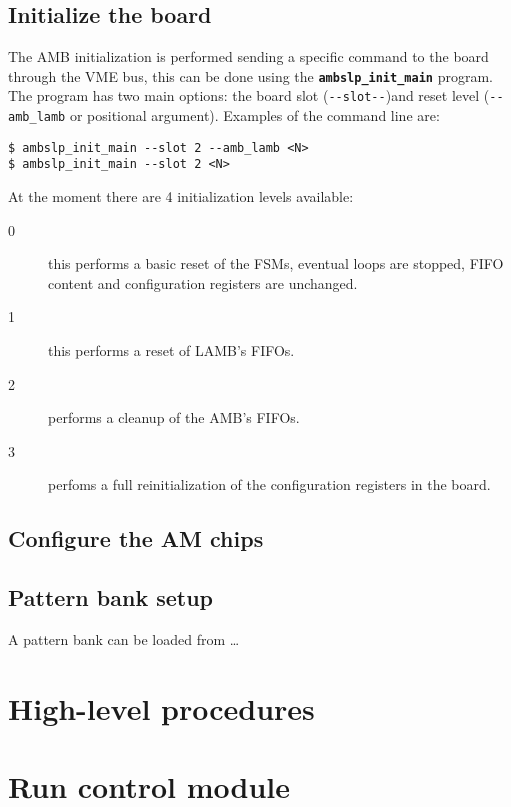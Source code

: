 \documentclass[UKenglish]{latex/atlasdoc}
\begin{document}
\subsection{Initialize the board}
\label{sec:ambslpinit}

The AMB initialization is performed sending a specific command
to the board through the VME bus, this can be done using the 
\textbf{\texttt{ambslp\_init\_main}} program. The program has two
main options: the board slot (\verb|--slot--|)and reset level (\verb|--amb_lamb| 
or positional argument).
Examples of the command line are:
\begin{verbatim}
$ ambslp_init_main --slot 2 --amb_lamb <N>
$ ambslp_init_main --slot 2 <N>
\end{verbatim}

At the moment there are 4 initialization levels available:
\begin{description}
	\item[0] this performs a basic reset of the FSMs, eventual loops
	are stopped, FIFO content and configuration registers are unchanged.
	
	\item[1] this performs a reset of LAMB's FIFOs.
	
	\item[2] performs a cleanup of the AMB's FIFOs.
	
	\item[3] perfoms a full reinitialization of the configuration registers
	in the board.
\end{description}


\subsection{Configure the AM chips}



\subsection{Pattern bank setup}
\label{sec:bankload}

A pattern bank can be loaded from \ldots

\section{High-level procedures}
\label{sec:highlevel}



\section{Run control module}
\end{document}
